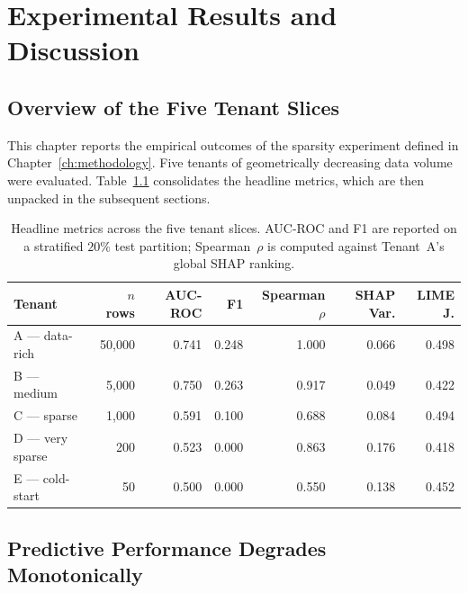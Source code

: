 \chapter{Experimental Results and Discussion}
\label{ch:results}

\section{Overview of the Five Tenant Slices}
\label{sec:results_overview}

This chapter reports the empirical outcomes of the sparsity experiment defined in Chapter~\ref{ch:methodology}. Five tenants of geometrically decreasing data volume were evaluated. Table~\ref{tab:results_summary} consolidates the headline metrics, which are then unpacked in the subsequent sections.

\begin{table}[H]
  \centering
  \caption{Headline metrics across the five tenant slices. AUC-ROC and F1 are reported on a stratified $20\%$ test partition; Spearman~$\rho$ is computed against Tenant~A's global SHAP ranking.}
  \label{tab:results_summary}
  \small
  \begin{tabularx}{\textwidth}{l r r r r r r}
    \toprule
    \textbf{Tenant} & \textbf{$n$ rows} & \textbf{AUC-ROC} & \textbf{F1} & \textbf{Spearman $\rho$} & \textbf{SHAP Var.} & \textbf{LIME J.} \\
    \midrule
    A --- data-rich   & 50{,}000 & 0.741 & 0.248 & 1.000 & 0.066 & 0.498 \\
    B --- medium      & 5{,}000  & 0.750 & 0.263 & 0.917 & 0.049 & 0.422 \\
    C --- sparse      & 1{,}000  & 0.591 & 0.100 & 0.688 & 0.084 & 0.494 \\
    D --- very sparse & 200      & 0.523 & 0.000 & 0.863 & 0.176 & 0.418 \\
    E --- cold-start  & 50       & 0.500 & 0.000 & 0.550 & 0.138 & 0.452 \\
    \bottomrule
  \end{tabularx}
\end{table}

\section{Predictive Performance Degrades Monotonically}
\label{sec:results_auc}

